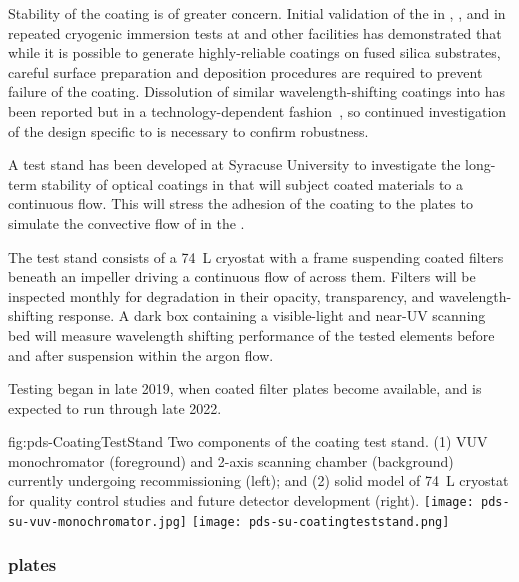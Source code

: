 Stability of the  coating is of greater concern.  Initial validation of the  in , , and in repeated cryogenic immersion tests at  and other facilities has demonstrated that while it is possible to generate highly-reliable  coatings on fused silica substrates, careful surface preparation and deposition procedures are required to prevent failure of the coating.  
Dissolution of similar wavelength-shifting coatings into  has been reported but in a technology-dependent fashion~\cite{Asaadi:2018ixs}, so continued investigation of the design specific to  is necessary to confirm robustness. 


A test stand has been developed at Syracuse University to investigate the long-term stability of  optical coatings in  that will
subject coated materials to a continuous flow. This will stress the adhesion of the coating to the plates to simulate the convective flow of  in the .
 
The test stand consists of a \SI{74}{L}  cryostat with a frame suspending coated filters beneath an impeller driving a continuous flow of  across them. Filters will be inspected monthly for degradation in their opacity, transparency, and wavelength-shifting response. A dark box containing a visible-light and near-UV scanning bed will measure wavelength shifting performance of the tested elements before and after suspension within the argon flow.


Testing began in late 2019, when coated filter plates become available, and is expected to run through late 2022. 

\begin{dunefigure}
 {fig:pds-CoatingTestStand}
 {Two components of the  coating test stand. (1) VUV monochromator (foreground) and 2-axis scanning chamber (background) 
 currently undergoing recommissioning (left); and (2) solid model of \SI{74}{L}  cryostat for quality control studies and future detector development (right).}
\texttt{[image: pds-su-vuv-monochromator.jpg]}
\hspace{0.02\textwidth}
\texttt{[image: pds-su-coatingteststand.png]}
\end{dunefigure}


\subsubsection{ plates}

